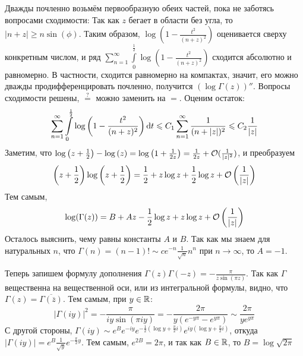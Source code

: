 \documentclass[a4paper]{report}
\begin{document}
{{    Дважды почленно возьмём первообразную обеих частей, пока не заботясь вопросами сходимости:
    Так как $z$ бегает в области без угла, то $|n + z| \ge n\sin(\phi)$.
        Таким образом, $\log\left(1 - \frac{t^2}{(n + z)^2}\right)$ оценивается сверху конкретным числом, и ряд $\sum\limits_{n = 1}^{\infty}\int\limits_{0}^{\frac{1}{2}}\log\left(1 - \frac{t^2}{(n + z)^2}\right)$ сходится абсолютно и равномерно.
        В частности, сходится равномерно на компактах, значит, его можно дважды продифференцировать почленно, получится $(\log \Gamma (z))''$.
        Вопросы сходимости решены, $\overset{?}=$ можно заменить на $=$.
    Оценим остаток:
    \[\sum\limits_{n = 1}^{\infty}\int\limits_{0}^{\frac{1}{2}}\log\left(1 - \frac{t^2}{(n + z)^2}\right)\operatorname{d}\! t \leqslant C_1 \sum\limits_{n = 1}^{\infty}\frac{1}{(n + |z|)^2} \leqslant C_2\frac{1}{|z|}\]
        Заметим, что $\log\left(z + \frac{1}{2}\right) - \log\left(z\right) = \log\left(1 + \frac{1}{2z}\right) = \frac{1}{2z}+ \mathcal{O}(\frac{1}{|z|^2})$, и преобразуем
    \[\left(z + \frac{1}{2}\right)\log\left(z + \frac{1}{2}\right) = \frac{1}{2} + z \log z + \frac{1}{2}\log z + \mathcal{O}\left(\frac{1}{|z|}\right)\]
    Тем самым,
    \[\log(\Gamma(z)) = B + Az - \frac{1}{2}\log z + z \log z + \mathcal{O}\left(\frac{1}{|z|}\right)\]
    Осталось выяснить, чему равны константы $A$ и $B$.
    Так как мы знаем для натуральных $n$, что $\Gamma(n) = (n - 1)! \sim c e^{-n}\frac{1}{\sqrt{n}}n^n$ при $n \to \infty$, то $A = -1$.

    Теперь запишем формулу дополнения $\Gamma(z) \Gamma(-z) = -\frac{\pi}{z \sin \left(\pi z\right)}$.
        Так как $\Gamma$ вещественна на вещественной оси, или из интегральной формулы, видно, что $\Gamma(z) = \overline{\Gamma\left(\overline{z}\right)}$.
        Тем самым, при $y \in \mathbb{R}$:
    \[|\Gamma(iy)|^2 = -\frac{\pi}{i y \sin\left(\pi i y\right)} = -\frac{2\pi }{y\left(e^{-y \pi} - e^{y\pi}\right)} \sim \frac{2\pi}{y e^{y\pi}}\]
    С другой стороны, $\Gamma(iy) \sim e^{B}e^{-iy}e^{-\frac{1}{2}\left(\log y + \frac{\pi}{2}i\right)}e^{iy\left(\log y + \frac{\pi}{2}i\right)}$, откуда $|\Gamma(iy)| = e^B \frac{1}{\sqrt{y}}e^{-\frac{\pi}{2}y}$.
        Тем самым, $e^{2B} = 2\pi$, и так как $B \in \mathbb{R}$, то $B = \log\sqrt{2\pi}$
    }
    }
\end{document}
